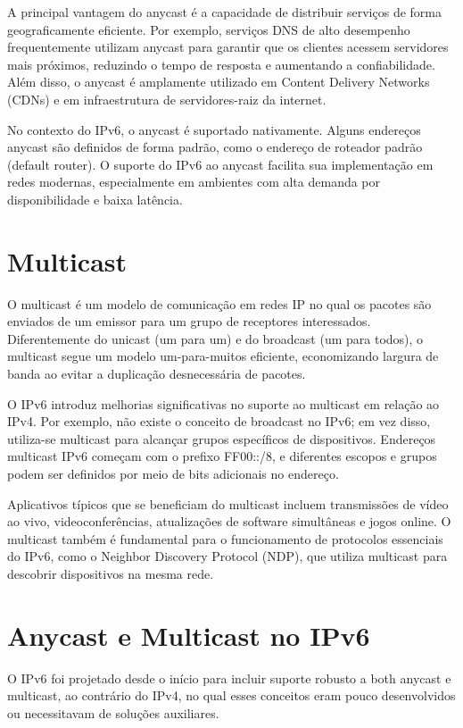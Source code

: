 \documentclass[12pt]{article}
\begin{document}
A principal vantagem do anycast é a capacidade de distribuir serviços de forma geograficamente eficiente. Por exemplo, serviços DNS de alto desempenho frequentemente utilizam anycast para garantir que os clientes acessem servidores mais próximos, reduzindo o tempo de resposta e aumentando a confiabilidade. Além disso, o anycast é amplamente utilizado em Content Delivery Networks (CDNs) e em infraestrutura de servidores-raiz da internet.

No contexto do IPv6, o anycast é suportado nativamente. Alguns endereços anycast são definidos de forma padrão, como o endereço de roteador padrão (default router). O suporte do IPv6 ao anycast facilita sua implementação em redes modernas, especialmente em ambientes com alta demanda por disponibilidade e baixa latência.

\section{Multicast}

O multicast é um modelo de comunicação em redes IP no qual os pacotes são enviados de um emissor para um grupo de receptores interessados. Diferentemente do unicast (um para um) e do broadcast (um para todos), o multicast segue um modelo um-para-muitos eficiente, economizando largura de banda ao evitar a duplicação desnecessária de pacotes.

O IPv6 introduz melhorias significativas no suporte ao multicast em relação ao IPv4. Por exemplo, não existe o conceito de broadcast no IPv6; em vez disso, utiliza-se multicast para alcançar grupos específicos de dispositivos. Endereços multicast IPv6 começam com o prefixo FF00::/8, e diferentes escopos e grupos podem ser definidos por meio de bits adicionais no endereço.

Aplicativos típicos que se beneficiam do multicast incluem transmissões de vídeo ao vivo, videoconferências, atualizações de software simultâneas e jogos online. O multicast também é fundamental para o funcionamento de protocolos essenciais do IPv6, como o Neighbor Discovery Protocol (NDP), que utiliza multicast para descobrir dispositivos na mesma rede.

\section{Anycast e Multicast no IPv6}

O IPv6 foi projetado desde o início para incluir suporte robusto a both anycast e multicast, ao contrário do IPv4, no qual esses conceitos eram pouco desenvolvidos ou necessitavam de soluções auxiliares.
\end{document}
